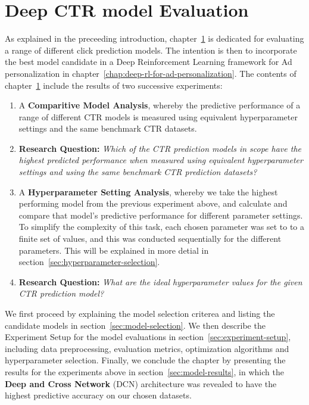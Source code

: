\documentclass{mldsmsc}
\begin{document}
\chapter{Deep CTR model Evaluation}
\label{chap:deep-ctr-model-evaluation}

As explained in the preceeding introduction, chapter~\ref{chap:deep-ctr-model-evaluation} is
dedicated for evaluating a range of different click prediction models. The intention is then to
incorporate the best model candidate in a Deep Reinforcement Learning framework for Ad personalization
in chapter~\ref{chap:deep-rl-for-ad-personalization}. The contents of chapter~\ref{chap:deep-ctr-model-evaluation}
include the results of two successive experiments:

\begin{enumerate}
    \item \label{exp:comparative-model-analysis} A \textbf{Comparitive Model Analysis}, whereby the predictive performance of a range of different CTR models
    is measured using equivalent hyperparameter settings and the same benchmark CTR datasets.
    \item[] \textbf{Research Question:} \emph{Which of the CTR prediction models in scope have the highest predicted performance
    when measured using equivalent hyperparameter settings and using the same benchmark CTR prediction datasets?}
    \item \label{exp:hyperparameter-analysis} A \textbf{Hyperparameter Setting Analysis}, whereby we take the highest performing model from the previous
    experiment above, and calculate and compare that model's predictive performance for different parameter settings. To
    simplify the complexity of this task, each chosen parameter was set to to a finite set of values, and this was conducted
    sequentially for the different parameters. This will be explained in more detial in section~\ref{sec:hyperparameter-selection}.
    \item[] \textbf{Research Question:} \emph{What are the ideal hyperparameter values for the given CTR prediction model?}
\end{enumerate}


We first proceed by explaining the model selection criterea and listing the candidate models in section~\ref{sec:model-selection}.
We then describe the Experiment Setup for the model evaluations in section~\ref{sec:experiment-setup}, including
data preprocessing, evaluation metrics, optimization algorithms and hyperparameter selection. Finally, we conclude the chapter
by presenting the results for the experiments above in section~\ref{sec:model-results}, in which the \textbf{Deep and Cross Network} (DCN) architecture \citep{RefWorks:wang2017deep}
was revealed to have the highest predictive accuracy on our chosen datasets.
\end{document}
